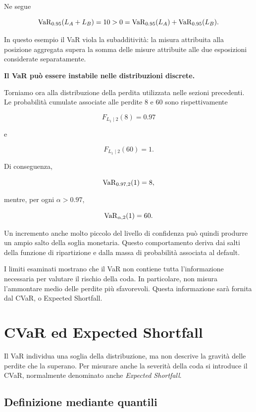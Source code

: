 Ne segue

\[
\operatorname{VaR}_{0.95}(L_A+L_B)
=
10
>
0
=
\operatorname{VaR}_{0.95}(L_A)
+
\operatorname{VaR}_{0.95}(L_B).
\]

In questo esempio il VaR viola la subadditivit\`{a}: la misura
attribuita alla posizione aggregata supera la somma delle misure
attribuite alle due esposizioni considerate separatamente.

\medskip

\noindent
\textbf{Il VaR pu\`{o} essere instabile nelle distribuzioni discrete.}

Torniamo ora alla distribuzione della perdita utilizzata nelle sezioni
precedenti. Le probabilit\`{a} cumulate associate alle perdite $8$ e
$60$ sono rispettivamente

\[
F_{L_1\mid 2}(8)=0.97
\]

e

\[
F_{L_1\mid 2}(60)=1.
\]

Di conseguenza,

\[
\operatorname{VaR}_{0.97,2}(1)=8,
\]

mentre, per ogni $\alpha>0.97$,

\[
\operatorname{VaR}_{\alpha,2}(1)=60.
\]

Un incremento anche molto piccolo del livello di confidenza pu\`{o}
quindi produrre un ampio salto della soglia monetaria. Questo
comportamento deriva dai salti della funzione di ripartizione e dalla
massa di probabilit\`{a} associata al default.

I limiti esaminati mostrano che il VaR non contiene tutta
l'informazione necessaria per valutare il rischio della coda. In
particolare, non misura l'ammontare medio delle perdite pi\`{u}
sfavorevoli. Questa informazione sar\`{a} fornita dal CVaR, o
Expected Shortfall.

\section{CVaR ed Expected Shortfall}

\label{sec:cap9-cvar-expected-shortfall}

Il VaR individua una soglia della distribuzione, ma non descrive la
gravit\`{a} delle perdite che la superano. Per misurare anche la
severit\`{a} della coda si introduce il CVaR, normalmente denominato
anche \emph{Expected Shortfall}.

\subsection{Definizione mediante quantili}

